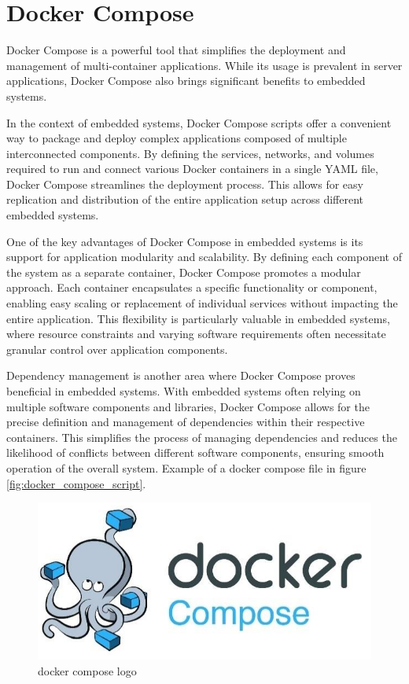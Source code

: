 \documentclass[
12pt,
oneside, 
onehalfspacing, 
nolistspacing, 
parskip, 
chapterinoneline, 
]{AASTCOMPUTER}
\begin{document}
\section{Docker Compose}
Docker Compose is a powerful tool that simplifies the deployment and management of multi-container applications. While its usage is prevalent in server applications, Docker Compose also brings significant benefits to embedded systems.

In the context of embedded systems, Docker Compose scripts offer a convenient way to package and deploy complex applications composed of multiple interconnected components. By defining the services, networks, and volumes required to run and connect various Docker containers in a single YAML file, Docker Compose streamlines the deployment process. This allows for easy replication and distribution of the entire application setup across different embedded systems.

One of the key advantages of Docker Compose in embedded systems is its support for application modularity and scalability. By defining each component of the system as a separate container, Docker Compose promotes a modular approach. Each container encapsulates a specific functionality or component, enabling easy scaling or replacement of individual services without impacting the entire application. This flexibility is particularly valuable in embedded systems, where resource constraints and varying software requirements often necessitate granular control over application components.

Dependency management is another area where Docker Compose proves beneficial in embedded systems. With embedded systems often relying on multiple software components and libraries, Docker Compose allows for the precise definition and management of dependencies within their respective containers. This simplifies the process of managing dependencies and reduces the likelihood of conflicts between different software components, ensuring smooth operation of the overall system. Example of a docker compose file in figure \ref{fig:docker_compose_script}.


\begin{figure}[h]
\centering
\includegraphics[scale=0.4]{Figures/17.png}
\caption[docker compose logo]{docker compose logo}
\label{fig:docker_compose_logo}
\end{figure}
\end{document}
